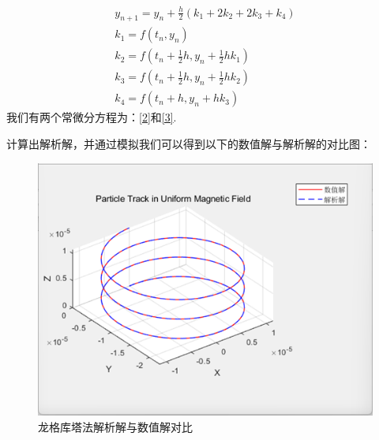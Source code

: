\documentclass[11pt]{article}
\begin{document}
    \begin{equation*}
        \begin{gathered}
            y_{n+1}=y_n+\frac{h}{2}\left(k_1+2 k_2+2 k_3+k_4\right) \\
            k_1=f\left(t_n, y_n\right) \\
            k_2=f\left(t_n+\frac{1}{2} h, y_n+\frac{1}{2} h k_1\right) \\
            k_3=f\left(t_n+\frac{1}{2} h, y_n+\frac{1}{2} h k_2\right) \\
            k_4=f\left(t_n+h, y_n+h k_3\right)
        \end{gathered}
    \end{equation*}
我们有两个常微分方程为：\cref{2}和\cref{3}.


计算出解析解，并通过模拟我们可以得到以下的数值解与解析解的对比图：
\begin{figure}[h]
    \centering
    \includegraphics[width=0.5\linewidth]{Fig/RK.png}
    \caption{龙格库塔法解析解与数值解对比}
    \label{fig:3}
\end{figure}
\newline
\end{document}
